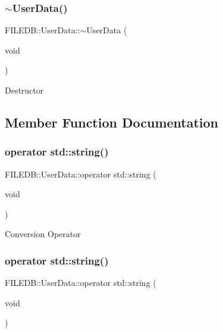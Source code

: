 \subsubsection{\texorpdfstring{$\sim$UserData()}{~UserData()}\hspace{0.1cm}{\footnotesize\ttfamily [2/2]}}
{\footnotesize\ttfamily F\+I\+L\+E\+D\+B\+::\+User\+Data\+::$\sim$\+User\+Data (\begin{DoxyParamCaption}\item[{void}]{ }\end{DoxyParamCaption})}

Destructor 

\subsection{Member Function Documentation}
\mbox{\label{classFILEDB_1_1UserData_a5e54144b7f24d68684ddc85e036d0605}} 
\subsubsection{\texorpdfstring{operator std::string()}{operator std::string()}\hspace{0.1cm}{\footnotesize\ttfamily [1/2]}}
{\footnotesize\ttfamily F\+I\+L\+E\+D\+B\+::\+User\+Data\+::operator std\+::string (\begin{DoxyParamCaption}\item[{void}]{ }\end{DoxyParamCaption})}

Conversion Operator \mbox{\label{classFILEDB_1_1UserData_a5e54144b7f24d68684ddc85e036d0605}} 
\subsubsection{\texorpdfstring{operator std::string()}{operator std::string()}\hspace{0.1cm}{\footnotesize\ttfamily [2/2]}}
{\footnotesize\ttfamily F\+I\+L\+E\+D\+B\+::\+User\+Data\+::operator std\+::string (\begin{DoxyParamCaption}\item[{void}]{ }\end{DoxyParamCaption})}

